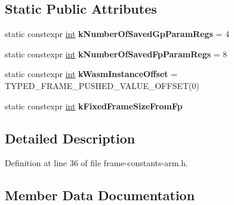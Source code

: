 \subsection*{Static Public Attributes}
\begin{DoxyCompactItemize}
\item 
\mbox{\label{classv8_1_1internal_1_1WasmCompileLazyFrameConstants_a7abbcdd6152875a0cda8f23299ac94e9}} 
static constexpr \mbox{\hyperlink{classint}{int}} {\bfseries k\+Number\+Of\+Saved\+Gp\+Param\+Regs} = 4
\item 
\mbox{\label{classv8_1_1internal_1_1WasmCompileLazyFrameConstants_a98e9416eb68e83ee6a9dec942b31cbf1}} 
static constexpr \mbox{\hyperlink{classint}{int}} {\bfseries k\+Number\+Of\+Saved\+Fp\+Param\+Regs} = 8
\item 
\mbox{\label{classv8_1_1internal_1_1WasmCompileLazyFrameConstants_ac37d957a95588310eb5db739bbbe1318}} 
static constexpr \mbox{\hyperlink{classint}{int}} {\bfseries k\+Wasm\+Instance\+Offset} = T\+Y\+P\+E\+D\+\_\+\+F\+R\+A\+M\+E\+\_\+\+P\+U\+S\+H\+E\+D\+\_\+\+V\+A\+L\+U\+E\+\_\+\+O\+F\+F\+S\+ET(0)
\item 
static constexpr \mbox{\hyperlink{classint}{int}} {\bfseries k\+Fixed\+Frame\+Size\+From\+Fp}
\end{DoxyCompactItemize}


\subsection{Detailed Description}


Definition at line 36 of file frame-\/constants-\/arm.\+h.



\subsection{Member Data Documentation}
\mbox{\label{classv8_1_1internal_1_1WasmCompileLazyFrameConstants_afc76e7a16abf94f5a338e41a1abf1ad9}} 
